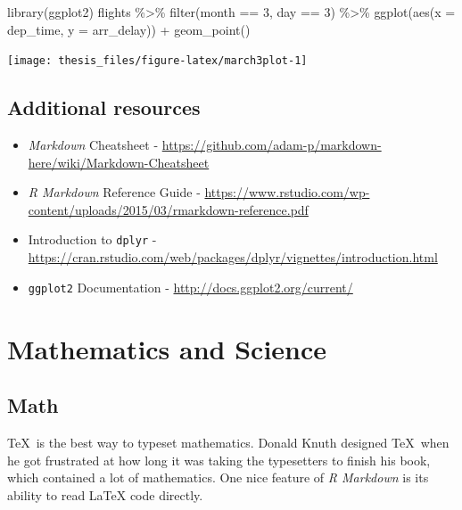 \documentclass[print]{nuthesis}
\newenvironment{Shaded}{\begin{snugshade}}{\end{snugshade}}
\newcommand{\AttributeTok}[1]{\textcolor[rgb]{0.77,0.63,0.00}{#1}}
\newcommand{\DecValTok}[1]{\textcolor[rgb]{0.00,0.00,0.81}{#1}}
\newcommand{\FunctionTok}[1]{\textcolor[rgb]{0.00,0.00,0.00}{#1}}
\newcommand{\NormalTok}[1]{#1}
\newcommand{\SpecialCharTok}[1]{\textcolor[rgb]{0.00,0.00,0.00}{#1}}
\begin{document}
\begin{Shaded}
\begin{Highlighting}[]
\FunctionTok{library}\NormalTok{(ggplot2)}
\NormalTok{flights }\SpecialCharTok{\%\textgreater{}\%} \FunctionTok{filter}\NormalTok{(month }\SpecialCharTok{==} \DecValTok{3}\NormalTok{, day }\SpecialCharTok{==} \DecValTok{3}\NormalTok{) }\SpecialCharTok{\%\textgreater{}\%} \FunctionTok{ggplot}\NormalTok{(}\FunctionTok{aes}\NormalTok{(}\AttributeTok{x =}\NormalTok{ dep\_time, }
    \AttributeTok{y =}\NormalTok{ arr\_delay)) }\SpecialCharTok{+} \FunctionTok{geom\_point}\NormalTok{()}
\end{Highlighting}
\end{Shaded}

\texttt{[image: thesis\_files/figure-latex/march3plot-1]}

\hypertarget{additional-resources}{%
\section{Additional resources}\label{additional-resources}}

\begin{itemize}
\item
  \emph{Markdown} Cheatsheet - \url{https://github.com/adam-p/markdown-here/wiki/Markdown-Cheatsheet}
\item
  \emph{R Markdown} Reference Guide - \url{https://www.rstudio.com/wp-content/uploads/2015/03/rmarkdown-reference.pdf}
\item
  Introduction to \texttt{dplyr} - \url{https://cran.rstudio.com/web/packages/dplyr/vignettes/introduction.html}
\item
  \texttt{ggplot2} Documentation - \url{http://docs.ggplot2.org/current/}
\end{itemize}

\hypertarget{math-sci}{%
\chapter{Mathematics and Science}\label{math-sci}}

\hypertarget{math}{%
\section{Math}\label{math}}

\TeX~is the best way to typeset mathematics. Donald Knuth designed \TeX~when he got frustrated at how long it was taking the typesetters to finish his book, which contained a lot of mathematics. One nice feature of \emph{R Markdown} is its ability to read LaTeX code directly.
\end{document}
